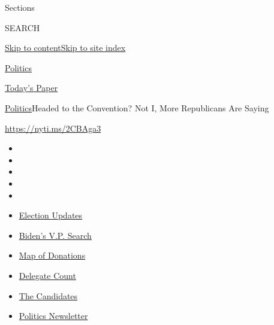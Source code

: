 Sections

SEARCH

\protect\hyperlink{site-content}{Skip to
content}\protect\hyperlink{site-index}{Skip to site index}

\href{https://www.nytimes.com/section/politics}{Politics}

\href{https://myaccount.nytimes.com/auth/login?response_type=cookie\&client_id=vi}{}

\href{https://www.nytimes.com/section/todayspaper}{Today's Paper}

\href{/section/politics}{Politics}\textbar{}Headed to the Convention?
Not I, More Republicans Are Saying

\url{https://nyti.ms/2CBAga3}

\begin{itemize}
\item
\item
\item
\item
\item
\end{itemize}

\begin{itemize}
\item
  \href{https://www.nytimes.com/2020/08/04/us/elections/primary-election-michigan-arizona-kansas.html?action=click\&pgtype=Article\&state=default\&region=TOP_BANNER\&context=storylines_menu}{Election
  Updates}
\item
  \href{https://www.nytimes.com/article/biden-vice-president-2020.html?action=click\&pgtype=Article\&state=default\&region=TOP_BANNER\&context=storylines_menu}{Biden's
  V.P. Search}
\item
  \href{https://www.nytimes.com/interactive/2020/07/24/us/politics/trump-biden-campaign-donors.html?action=click\&pgtype=Article\&state=default\&region=TOP_BANNER\&context=storylines_menu}{Map
  of Donations}
\item
  \href{https://www.nytimes.com/interactive/2020/us/elections/delegate-count-primary-results.html?action=click\&pgtype=Article\&state=default\&region=TOP_BANNER\&context=storylines_menu}{Delegate
  Count}
\item
  \href{https://www.nytimes.com/interactive/2019/us/politics/2020-presidential-candidates.html?action=click\&pgtype=Article\&state=default\&region=TOP_BANNER\&context=storylines_menu}{The
  Candidates}
\item
  \href{https://www.nytimes.com/newsletters/politics?action=click\&pgtype=Article\&state=default\&region=TOP_BANNER\&context=storylines_menu}{Politics
  Newsletter}
\end{itemize}

